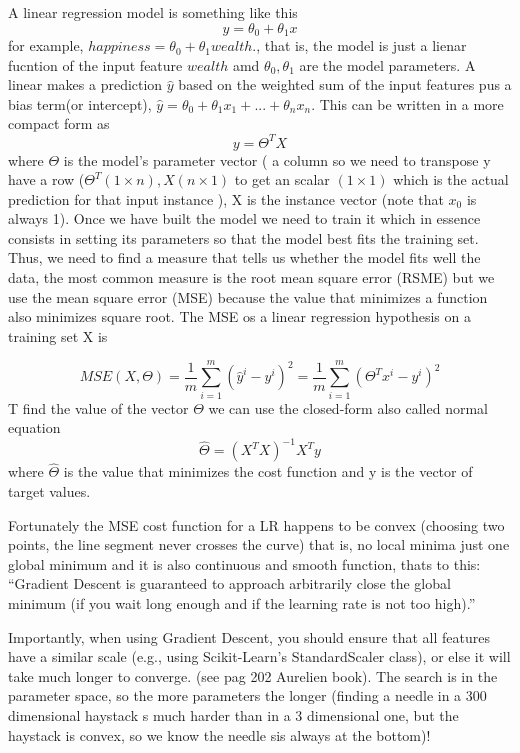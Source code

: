 \documentclass[12pt]{report}
\begin{document}
A linear regression model is something like this
\begin{equation}
y = \theta_0 + \theta_{1}x
\end{equation}
for example, $happiness = \theta_0 + \theta_1 wealth$., that is, the model is just a lienar fucntion of the input feature $wealth$ amd $\theta_0, \theta_{1}$ are the model parameters. A linear makes a prediction $\hat{y}$ based on the weighted sum of the input features pus a bias term(or intercept), $\hat{y} = \theta_0 + \theta_1 x_1 + ...+ \theta_n x_n$. This can be written in a more compact form as
\begin{equation}
y = \Theta^{T} X 
\end{equation}
where $\Theta$ is the model's parameter vector ( a column so we need to transpose y have a row ($\Theta^{T} (1 \times n), X (n \times 1)$ to get an scalar $(1 \times 1)$ which is the actual prediction for that input instance ), X is the instance vector (note that $x_0$ is always 1).
Once we have built the model we need to train it which in essence consists in setting its parameters so that the model best fits the training set. Thus, we need to find a measure that tells us whether the model fits well the data, the most common measure is the root mean square error (RSME) but we use the mean square error (MSE) because the value that minimizes a function also minimizes square root.
The MSE os a linear regression hypothesis on a training set X is

\begin{equation}
MSE(X,\Theta) = \frac{1}{m} \sum_{i=1}^{m}(\hat{y}^{i} - y^{i})^2 = \frac{1}{m} \sum_{i=1}^{m}(\Theta^Tx^{i} - y^{i})^2
\end{equation}
T find the value of the vector $\Theta$ we can use the closed-form also called normal equation
\begin{equation}
\hat{\Theta} = (X^{T}X)^{-1}X^{T}y
\end{equation}
where $\hat{\Theta}$ is the value that minimizes the cost function and y is the vector of target values.

Fortunately the MSE cost function for a LR happens to be convex (choosing two points, the line segment never crosses the curve) that is, no local minima just one global minimum and it is also continuous and smooth function, thats to this: “Gradient Descent is guaranteed to approach arbitrarily close the global minimum (if you wait long enough and if the learning rate is not too high).”

Importantly, when using Gradient Descent, you should ensure that all features have a similar scale (e.g., using Scikit-Learn’s StandardScaler class), or else it will take much longer to converge. (see pag 202 Aurelien book). The search is in the parameter space, so the more parameters the longer (finding a needle in a 300 dimensional haystack s much harder than in a 3 dimensional one, but the haystack is convex, so we know the needle sis always at the bottom)!
\end{document}
